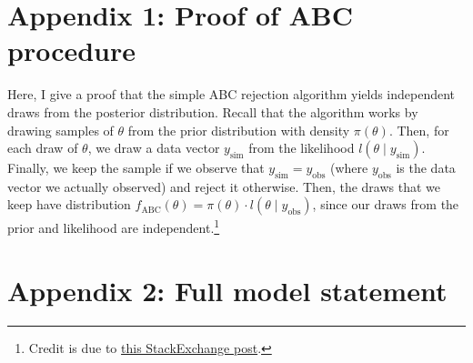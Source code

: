 \documentclass[
  oneside]{book}
\begin{document}
\hypertarget{appendix-1-proof-of-abc-procedure}{%
\section{Appendix 1: Proof of ABC procedure}\label{appendix-1-proof-of-abc-procedure}}

Here, I give a proof that the simple ABC rejection algorithm yields independent draws from the posterior distribution. Recall that the algorithm works by drawing samples of \(\theta\) from the prior distribution with density \(\pi (\theta)\). Then, for each draw of \(\theta\), we draw a data vector \(y_{\text {sim}}\) from the likelihood \(l(\theta \mid y_{\text{sim}})\). Finally, we keep the sample if we observe that \(y_{\text{sim}} = y_{\text{obs}}\) (where \(y_{\text{obs}}\) is the data vector we actually observed) and reject it otherwise. Then, the draws that we keep have distribution \(f_{\text{ABC}}(\theta) = \pi(\theta) \cdot l(\theta \mid y_{\text{obs}})\), since our draws from the prior and likelihood are independent.\footnote{Credit is due to \href{https://stats.stackexchange.com/questions/380076/proof-of-approximate-exact-bayesian-computation.}{this StackExchange post}.}

\hypertarget{appendix-2-full-model-statement}{%
\section{Appendix 2: Full model statement}\label{appendix-2-full-model-statement}}
\end{document}
